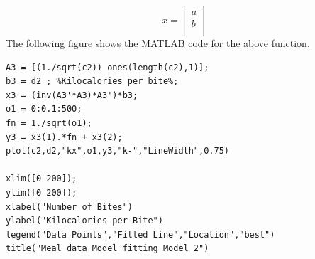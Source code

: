 \documentclass{article}
\begin{document}
\begin{equation}
x=
\begin{bmatrix}
a\\b\\
\end{bmatrix}
\end{equation}
The following figure shows the MATLAB code for the above function.\\
\begin{lstlisting}[frame=single]
A3 = [(1./sqrt(c2)) ones(length(c2),1)];
b3 = d2 ; %Kilocalories per bite%;
x3 = (inv(A3'*A3)*A3')*b3;
o1 = 0:0.1:500;
fn = 1./sqrt(o1);
y3 = x3(1).*fn + x3(2);
plot(c2,d2,"kx",o1,y3,"k-","LineWidth",0.75)

xlim([0 200]);
ylim([0 200]);
xlabel("Number of Bites")
ylabel("Kilocalories per Bite")
legend("Data Points","Fitted Line","Location","best")
title("Meal data Model fitting Model 2")
\end{lstlisting}


\newpage
\end{document}
